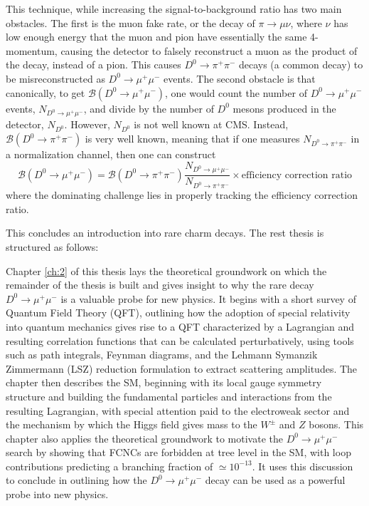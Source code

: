 This technique, while increasing the signal-to-background ratio has two main obstacles. The first is the muon fake rate, or the decay of $\pi \to \mu \nu$, where $\nu$ has low enough energy that the muon and pion have essentially the same 4-momentum, causing the detector to falsely reconstruct a muon as the product of the decay, instead of a pion. This causes $D^0 \to \pi^+ \pi^-$ decays (a common decay) to be misreconstructed as $D^0 \to \mu^+ \mu^-$ events. The second obstacle is that canonically, to get $\mathcal{B}(D^0 \to \mu^+ \mu^-)$, one would count the number of $D^0 \to \mu^+ \mu^-$ events, $N_{D^0 \to \mu^+ \mu^-}$, and divide by the number of $D^0$ mesons produced in the detector, $N_{D^0}$. However, $N_{D^0}$ is not well known at CMS. Instead, $\mathcal{B}(D^0 \to \pi^+ \pi^-)$ is very well known, meaning that if one measures $N_{D^0 \to \pi^+ \pi^-}$ in a normalization channel, then one can construct
$$
\mathcal{B}(D^0 \to \mu^+ \mu^-) = \mathcal{B}(D^0 \to \pi^+ \pi^-) \frac{N_{D^0 \to \mu^+ \mu^-}}{N_{D^0 \to \pi^+ \pi^-}} \times \text{efficiency correction ratio}
$$
where the dominating challenge lies in properly tracking the efficiency correction ratio.

\bigbreak

This concludes an introduction into rare charm decays. The rest thesis is structured as follows:

Chapter \ref{ch:2} of this thesis lays the theoretical groundwork on which the remainder of the thesis is built and gives insight to why the rare decay $D^0 \to \mu^+ \mu^-$ is a valuable probe for new physics. It begins with a short survey of Quantum Field Theory (QFT), outlining how the adoption of special relativity into quantum mechanics gives rise to a QFT characterized by a Lagrangian and resulting correlation functions that can be calculated perturbatively, using tools such as path integrals, Feynman diagrams, and the Lehmann Symanzik Zimmermann (LSZ) reduction formulation to extract scattering amplitudes. The chapter then describes the SM, beginning with its local gauge symmetry structure and building the fundamental particles and interactions from the resulting Lagrangian, with special attention paid to the electroweak sector and the mechanism by which the Higgs field gives mass to the $W^\pm$ and $Z$ bosons. This chapter also applies the theoretical groundwork to motivate the $D^0 \to \mu^+ \mu^-$  search by showing that FCNCs are forbidden at tree level in the SM, with loop contributions predicting a branching fraction of $\simeq 10^{-13}$. It uses this discussion to conclude in outlining how the $D^0 \to \mu^+ \mu^-$ decay can be used as a powerful probe into new physics. 


